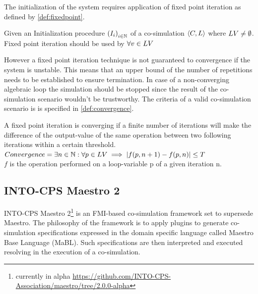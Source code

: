 The initialization of the system requires application of fixed point iteration as defined by \cref{def:fixedpoint}.
\begin{definition}\label{def:fixedpoint}
Given an Initialization procedure $ \left( I_i \right)_{i \in \mathbb{N}}$ of a co-simulation $ \left\langle C, L \right\rangle $ where $LV \neq \emptyset$.\\
Fixed point iteration should be used by 
$\forall v \in LV $

\end{definition}

However a fixed point iteration technique is not guaranteed to convergence if the system is unstable. This means that an upper bound of the number of repetitions needs to be established to ensure termination. In case of a non-converging algebraic loop the simulation should be stopped since the result of the co-simulation scenario wouldn't be trustworthy. The criteria of a valid co-simulation scenario is is specified in \cref{def:convergence}.

\begin{definition}\label{def:convergence}
A fixed point iteration is converging if a finite number of iterations will make the difference of the output-value of the same operation between two following iterations within a certain threshold.\\
$Convergence = \exists n \in \mathbb{N}: \forall p \in LV \implies |f(p, n + 1) - f(p, n)| \leq T$\\
$f$ is the operation performed on a loop-variable p of a given iteration n.
\end{definition}


\subsection{INTO-CPS Maestro 2}
INTO-CPS Maestro 2\footnote{currently in alpha \url{https://github.com/INTO-CPS-Association/maestro/tree/2.0.0-alpha}}\cite{thule_maestro2_2019} is an FMI-based co-simulation framework set to supersede Maestro\cite{Maestro}. The philosophy of the framework is to apply plugins to generate co-simulation specifications expressed in the domain specific language called Maestro Base Language (MaBL). Such specifications are then interpreted and executed resolving in the execution of a co-simulation.
